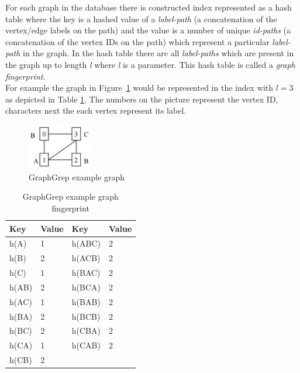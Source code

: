 For each graph in the database there is constructed index represented as a hash table where the key is a hashed value of a \textit{label-path} (a concatenation of the vertex/edge labels on the path) and the value is a number of unique \textit{id-paths} (a concatenation of the vertex IDs on the path) which represent a particular \textit{label-path} in the graph. In the hash table there are all \textit{label-paths} which are present in the graph up to length \textit{l} where \textit{l} is a parameter. This hash table is called a \textit{graph fingerprint}.\\

For example the graph in Figure~\ref{fig:graphgrep} would be represented in the index with $l=3$ as depicted in Table \ref{tab:graphgrep}. The numbers on the picture represent the vertex ID, characters next the each vertex represent its label.

\begin{figure}[h]
	\centering
	\includegraphics[width=0.25\textwidth]{../img/graphgrep.png}
	\caption{GraphGrep example graph}
	\label{fig:graphgrep}
\end{figure}

\begin{table}[h]
	\centering
	\renewcommand{\arraystretch}{2.5}
	\setlength{\arrayrulewidth}{0.5mm}
	\begin{tabular}[h!]{|p{3cm} p{3cm}|p{3cm} p{3cm}|}
		\hline
		\rowcolor{lightgray}
		Key & Value & Key & Value\\ \hline
		h(A) & 1 & h(ABC) & 2\\
		h(B) & 2 & h(ACB) & 2\\
		h(C) & 1 & h(BAC) & 2\\
		h(AB) & 2 & h(BCA) & 2\\
		h(AC) & 1 & h(BAB) & 2\\
		h(BA) & 2 & h(BCB) & 2\\
		h(BC) & 2 & h(CBA) & 2\\
		h(CA) & 1 & h(CAB) & 2\\
		h(CB) & 2 & & \\ \hline
	\end{tabular}
\caption{GraphGrep example graph fingerprint}
\label{tab:graphgrep}
\end{table}

